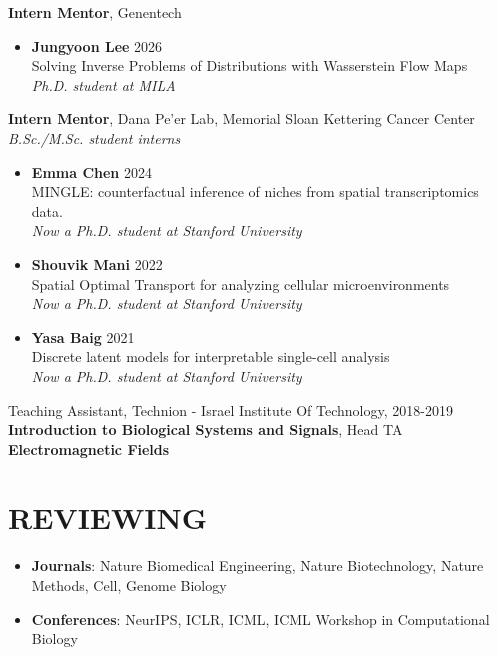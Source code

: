 \documentclass[a4paper,9pt]{extarticle}
\begin{document}
\noindent
\textbf{Intern Mentor}, Genentech
\begin{itemize}[leftmargin=1.25em, itemsep=6pt, topsep=4pt]
  \item \textbf{Jungyoon Lee} \hfill 2026 \\
  Solving Inverse Problems of Distributions with Wasserstein Flow Maps \\
  \textit{Ph.D. student at MILA}
\end{itemize}
\vspace{6pt}

\noindent
\textbf{Intern Mentor}, Dana Pe'er Lab, Memorial Sloan Kettering Cancer Center \\
\textit{B.Sc./M.Sc. student interns}
\begin{itemize}[leftmargin=1.25em, itemsep=6pt, topsep=4pt]
  \item \textbf{Emma Chen} \hfill 2024 \\
  MINGLE: counterfactual inference of niches from spatial transcriptomics data. \\
  \textit{Now a Ph.D. student at Stanford University}
  \item \textbf{Shouvik Mani} \hfill 2022 \\
  Spatial Optimal Transport for analyzing cellular microenvironments \\
  \textit{Now a Ph.D. student at Stanford University}
  \item \textbf{Yasa Baig} \hfill 2021 \\
  Discrete latent models for interpretable single-cell analysis \\
  \textit{Now a Ph.D. student at Stanford University}
\end{itemize}
\vspace{6pt}

\noindent
Teaching Assistant, Technion - Israel Institute Of Technology, \hfill 2018-2019\\
\textbf{Introduction to Biological Systems and Signals}, Head TA \\
\textbf{Electromagnetic Fields}\\


\section*{REVIEWING}
\begin{itemize}
  \item \textbf{Journals}: Nature Biomedical Engineering, Nature Biotechnology, Nature Methods, Cell, Genome Biology
  \item \textbf{Conferences}: NeurIPS, ICLR, ICML, ICML Workshop in Computational Biology
\end{itemize}

\end{document}
